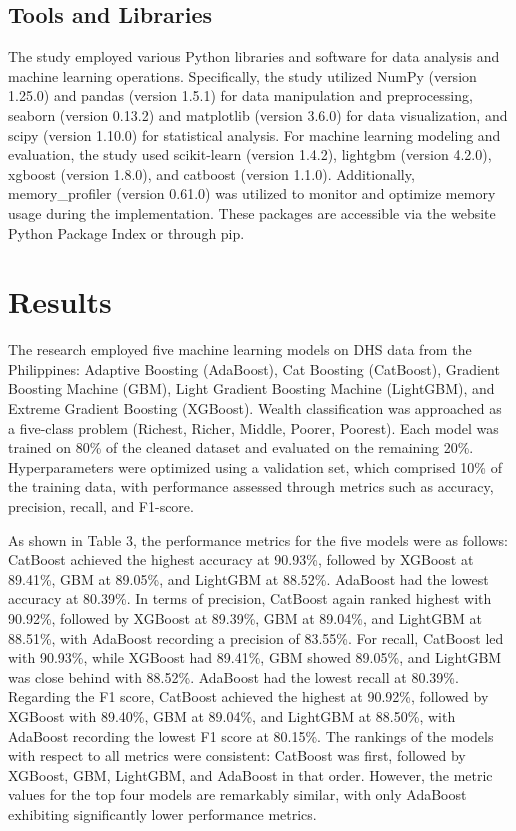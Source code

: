 \documentclass[a4paper,fleqn]{cas-sc}
\begin{document}
\subsection{Tools and Libraries}
The study employed various Python libraries and software for data analysis and machine learning operations. Specifically, the study utilized NumPy (version 1.25.0) and pandas (version 1.5.1) for data manipulation and preprocessing, seaborn (version 0.13.2) and matplotlib (version 3.6.0) for data visualization, and scipy (version 1.10.0) for statistical analysis. For machine learning modeling and evaluation, the study used scikit-learn (version 1.4.2), lightgbm (version 4.2.0), xgboost (version 1.8.0), and catboost (version 1.1.0). Additionally, memory\_profiler (version 0.61.0) was utilized to monitor and optimize memory usage during the implementation. These packages are accessible via the website Python Package Index or through pip.

\section{Results}

The research employed five machine learning models on DHS data from the Philippines: Adaptive Boosting (AdaBoost), Cat Boosting (CatBoost), Gradient Boosting Machine (GBM), Light Gradient Boosting Machine (LightGBM), and Extreme Gradient Boosting (XGBoost). Wealth classification was approached as a five-class problem (Richest, Richer, Middle, Poorer, Poorest). Each model was trained on 80\% of the cleaned dataset and evaluated on the remaining 20\%. Hyperparameters were optimized using a validation set, which comprised 10\% of the training data, with performance assessed through metrics such as accuracy, precision, recall, and F1-score.

As shown in Table 3, the performance metrics for the five models were as follows: CatBoost achieved the highest accuracy at 90.93\%, followed by XGBoost at 89.41\%, GBM at 89.05\%, and LightGBM at 88.52\%. AdaBoost had the lowest accuracy at 80.39\%. In terms of precision, CatBoost again ranked highest with 90.92\%, followed by XGBoost at 89.39\%, GBM at 89.04\%, and LightGBM at 88.51\%, with AdaBoost recording a precision of 83.55\%. For recall, CatBoost led with 90.93\%, while XGBoost had 89.41\%, GBM showed 89.05\%, and LightGBM was close behind with 88.52\%. AdaBoost had the lowest recall at 80.39\%. Regarding the F1 score, CatBoost achieved the highest at 90.92\%, followed by XGBoost with 89.40\%, GBM at 89.04\%, and LightGBM at 88.50\%, with AdaBoost recording the lowest F1 score at 80.15\%. The rankings of the models with respect to all metrics were consistent: CatBoost was first, followed by XGBoost, GBM, LightGBM, and AdaBoost in that order. However, the metric values for the top four models are remarkably similar, with only AdaBoost exhibiting significantly lower performance metrics.
\end{document}
